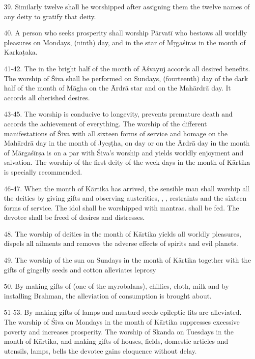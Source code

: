 39. Similarly twelve  shall he worshipped after assigning them
the twelve names of any deity to gratify that deity.

40. A person who seeks prosperity shall worship Pārvatī who bestows all worldly
pleasures on Mondays,  (ninth) day, and in the star of Mṛgaśiras in
the month of Karkaṭaka.

41-42. The  in the bright half of the month of Āśvayuj accords all
desired benefits. The worship of Śiva shall be performed on Sundays,
 (fourteenth) day of the dark half of the month of Māgha on
the Ārdrā star and on the Mahārdrā day. It accords all cherished desires.

43-45. The worship is conducive to longevity, prevents premature death and
accords the achievement of everything. The worship of the different
manifestations of Śiva with all sixteen forms of service and homage on
the Mahārdrā day in the month of Jyeṣṭha, on  day or on the Ārdrā
day in the month of Mārgaśīrṣa is on a par with Śiva’s worship and yields
worldly enjoyment and salvation. The worship of the first deity of the week days
in the month of Kārtika is specially recommended.

46-47. When the month of Kārtika has arrived, the sensible man shall worship all
the deities by giving gifts and observing austerities, , ,
restraints and the sixteen forms of service. The idol shall be worshipped with
mantras.  shall be fed. The devotee shall be freed of desires and
distresses.

48. The worship of deities in the month of Kārtika yields all worldly pleasures,
dispels all ailments and removes the adverse effects of spirits and evil planets.

49. The worship of the sun on Sundays in the month of Kārtika together with
the gifts of gingelly seeds and cotton alleviates leprosy \etc

50. By making gifts of  (one of the myrobalans), chillies, cloth,
milk \etc and by installing Brahman, the alleviation of consumption is brought
about.

51-53. By making gifts of lamps and mustard seeds epileptic fits are alleviated.
The worship of Śiva on Mondays in the month of Kārtika suppresses excessive
poverty and increases prosperity. The worship of Skanda on Tuesdays in the month
of Kārtika, and making gifts of houses, fields, domestic articles and utensils,
lamps, bells \etc the devotee gains eloquence without delay.


